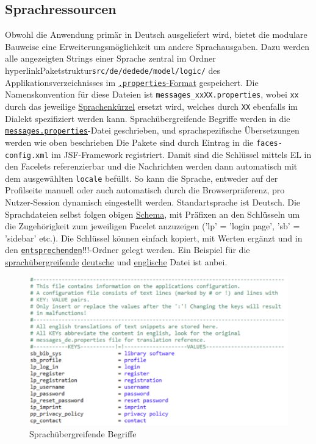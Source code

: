 \documentclass{article}
\begin{document}
\subsection{Sprachressourcen}
\indent Obwohl die Anwendung primär in Deutsch ausgeliefert wird, bietet die modulare Bauweise eine Erweiterungsmöglichkeit um andere Sprachausgaben. Dazu werden alle angezeigten Strings einer Sprache zentral im Ordner hyperlink{Paketstruktur}{\texttt{src/de/dedede/model/logic/}} des Applikationsverzeichnisses im \hyperlink{https://de.wikipedia.org/wiki/Java-Properties-Datei}{\texttt{.properties}-Format} gespeichert. Die Namenskonvention für diese Dateien ist \texttt{messages\_xxXX.properties}, wobei \texttt{xx} durch das jeweilige \hyperlink{https://de.wikipedia.org/wiki/Liste_der_ISO-639-1-Codes}{Sprachenkürzel} ersetzt wird, welches durch \texttt{XX} ebenfalls im Dialekt spezifiziert werden kann. Sprachübergreifende Begriffe werden in die \hyperlink{messages}{\texttt{messages.properties}}-Datei geschrieben, und sprachspezifische Übersetzungen werden wie oben beschrieben  Die Pakete sind durch Eintrag in die \texttt{faces-config.xml} im JSF-Framework registriert. Damit sind die Schlüssel mittels EL in den Facelets referenzierbar und die Nachrichten werden dann automatisch mit dem ausgewählten \texttt{locale} befüllt.  So kann die Sprache, entweder auf der Profilseite manuell oder auch automatisch durch die Browserpräferenz, pro Nutzer-Session dynamisch eingestellt werden. Standartsprache ist Deutsch. Die Sprachdateien selbst folgen obigen \hyperlink{propSchema}{Schema}, mit Präfixen an den Schlüsseln um die Zugehörigkeit zum jeweiligen Facelet anzuzeigen ('lp' = 'login page', 'sb' = 'sidebar' etc.). Die Schlüssel können einfach kopiert, mit Werten ergänzt und in den \hyperlink{Paketstruktur}{\texttt{entsprechenden}}!!!-Ordner gelegt werden. Ein Beispiel für die \hyperlink{messages}{sprachübergreifende} \hyperlink{messagesde}{deutsche} und \hyperlink{messagesen}{englische} Datei ist anbei.\\
\begin{figure}[H]
\hypertarget{messages}{}
\centering
\includegraphics[width=50em]{messagesen}
\caption{Sprachübergreifende Begriffe}
\end{figure}
\end{document}

